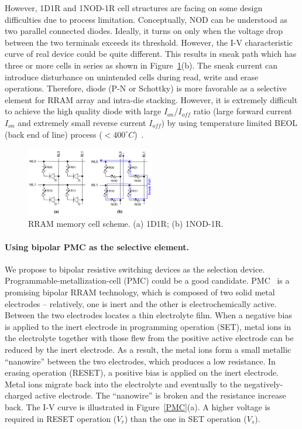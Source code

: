 However, 1D1R and 1NOD-1R cell structures are facing on some design difficulties due to process limitation. Conceptually, NOD can be understood as two parallel connected diodes. Ideally, it turns on only when the voltage drop between the two terminals exceeds its threshold. However, the I-V characteristic curve of real device could be quite different.
This results in sneak path which has three or more cells in series as shown in Figure~\ref{RRAM2}(b). The sneak current can introduce disturbance on unintended cells during read, write and erase operations. Therefore, diode (P-N or Schottky) is more favorable as a selective element for RRAM array and intra-die stacking. However, it is extremely difficult to achieve the high quality diode with large $I_{on}$/$I_{off}$ ratio (large forward current $I_{on}$ and extremely small reverse current $I_{off}$) by using temperature limited BEOL (back end of line) process ($<400 ^{\circ}C$)~\cite{Sun:147791}.



\begin{figure}\centering
\includegraphics[width=0.50\textwidth]{./figure/HL-RRAM2.png}
\caption{RRAM memory cell scheme. (a) 1D1R; (b) 1NOD-1R.}\label{RRAM2}
\end{figure}




\paragraph{Using bipolar PMC as the selective element.} We propose to bipolar resistive switching devices as the selection device. Programmable-metallization-cell (PMC) could be a good candidate. PMC~\cite{Kozicki05} is a promising bipolar RRAM technology, which is composed of two solid metal electrodes -- relatively, one is inert and the other is electrochemically active. Between the two electrodes locates a thin electrolyte film. When a negative bias is applied to the inert electrode in programming operation (SET), metal ions in the electrolyte together with those flew from the positive active electrode can be reduced by the inert electrode. As a result, the metal ions form a small metallic ``nanowire'' between the two electrodes, which produces a low resistance. In erasing operation (RESET), a positive bias is applied on the inert electrode. Metal ions migrate back into the electrolyte and eventually to the negatively-charged active electrode. The ``nanowire'' is broken and the resistance increase back. The I-V curve is illustrated in Figure~\ref{PMC}(a). A higher voltage is required in RESET operation ($V_r$) than the one in SET operation ($V_s$).


